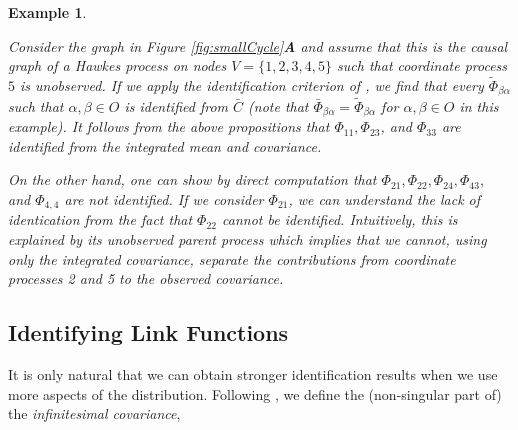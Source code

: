 \documentclass[accepted]{uai2021} %
\newtheorem{exmp}[thm]{Example}
\begin{document}
\begin{exmp}
\begin{figure*}
\begin{subfigure}{0.3\linewidth}
\begin{tikzpicture}[scale=0.7]
					\end{tikzpicture}
				\end{subfigure}
				\caption{\label{fig:smallCycle} \textbf{A}: Directed graph such 
					that 
					each node represents a coordinate process and an edge 
					$\alpha 
					\rightarrow \beta$ implies that $\Phi_{\beta\alpha}\neq 0$. 
					\textbf{B}: Latent projection of the graph \textbf{A} on 
					nodes $O = 
					\{1,2,3,4\}$. \textbf{C}: Graphs \textbf{B} and \textbf{C} 
					are 
					Markov 
					equivalent (entail the same $\mu$-separations), yet are 
					distinguishable using an equality constraint on the 
					observable 
					matrix $\bar{C} = C_{OO}$. Loops 
					(self-edges) are omitted from 
					graphs \textbf{A}, \textbf{B}, and \textbf{C}.}
			\end{figure*}
	Consider the graph in Figure \ref{fig:smallCycle}\textbf{A} and assume that 
	this is the causal graph of a Hawkes process on nodes $V = \{1,2,3,4,5\}$ 
	such that coordinate process $5$ is unobserved. If we apply the 
	identification criterion of \cite{weihs2018}, we find that every 
	$\tilde{\Phi}_{\beta\alpha}$ 
	such that 
	$\alpha,\beta\in O$ is identified from $\bar{C}$ (note that 
	$\bar{\Phi}_{\beta\alpha} = 
	\tilde{\Phi}_{\beta\alpha}$ for $\alpha,\beta\in O$ in this example). It 
	follows 
	from the 
	above propositions that $\Phi_{11}, \Phi_{23}$, and $\Phi_{33}$ are 
	identified from 
	the integrated mean and covariance.
	
	On the other hand, one can show by direct computation that $\Phi_{21}, 
	\Phi_{22}, 
	\Phi_{24}, 
	\Phi_{43},$ and $\Phi_{4,4}$ are not identified. If we consider 
	$\Phi_{21}$, we can 
	understand the lack of identication from the fact that $\Phi_{22}$ 
	cannot 
	be identified. 
	Intuitively, this is explained by its unobserved parent process which 
	implies that we 
	cannot, using only the integrated covariance, separate the contributions 
	from coordinate processes 2 and 5 to the observed covariance. 
\end{exmp}



\subsection{Identifying Link Functions}
\label{ssec:idCauFunc}

It is only natural that we can obtain stronger identification results when we 
use more aspects of the distribution. Following 
\cite{bacry2016}, we define the (non-singular part of) the \emph{infinitesimal 
covariance},
\end{document}
